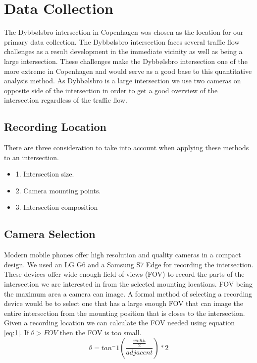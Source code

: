 \documentclass[
10pt, %
a4paper, %
oneside, %
headinclude,footinclude, %
] {book}%
\begin{document}
\section{Data Collection}

The Dybbølsbro intersection in Copenhagen was chosen as the location for our primary data collection. 
The Dybbølsbro intersection faces several traffic flow challenges as a result development in the immediate vicinity as well as being a large intersection.
These challenges make the Dybbølsbro intersection one of the more extreme in Copenhagen and would serve as a good base to this quantitative analysis method. 
As Dybbølsbro is a large intersection we use two cameras on opposite side of the intersection in order to get a good overview of the intersection regardless of the traffic flow.

\subsection{Recording Location}

There are three consideration to take into account when applying these methods to an intersection.
\begin{itemize}
	\item1. Intersection size.
	\item2. Camera mounting points.
	\item3. Intersection composition
\end{itemize}

\subsection{Camera Selection}

Modern mobile phones offer high resolution and quality cameras in a compact design. We used an LG G6 and a Samsung S7 Edge for recording the intersection.
These devices offer wide enough field-of-views (FOV) to record the parts of the intersection we are interested in from the selected mounting locations.
FOV being the maximum area a camera can image. A formal method of selecting a recording device would be to select one that has a large enough FOV that can image the entire intersection 
from the mounting position that is closes to the intersection. Given a recording location we can calculate the FOV needed using equation \ref{eq:1}.
If $\theta > FOV$ then the FOV is too small.
\begin{equation}
    \theta = tan^-1(\frac{\frac{width}{2}}{adjacent}) * 2\label{eq:1}
  \end{equation}
\end{document}
